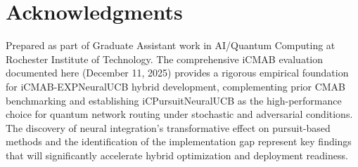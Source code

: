 \documentclass[12pt,a4paper]{article}
\begin{document}
\newpage
\section{Acknowledgments}

Prepared as part of Graduate Assistant work in AI/Quantum Computing at Rochester Institute of Technology. The comprehensive iCMAB evaluation documented here (December 11, 2025) provides a rigorous empirical foundation for iCMAB-EXPNeuralUCB hybrid development, complementing prior CMAB benchmarking and establishing iCPursuitNeuralUCB as the high-performance choice for quantum network routing under stochastic and adversarial conditions. The discovery of neural integration's transformative effect on pursuit-based methods and the identification of the implementation gap represent key findings that will significantly accelerate hybrid optimization and deployment readiness.
\end{document}
